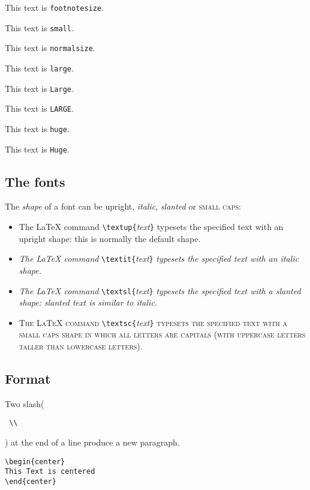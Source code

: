 {\footnotesize This text is \texttt{footnotesize}}.

{\small This text is \texttt{small}}.

{\normalsize This text is \texttt{normalsize}}.

{\large This text is \texttt{large}}.

{\Large This text is \texttt{Large}}.

{\LARGE This text is \texttt{LARGE}}.

{\huge This text is \texttt{huge}}.

{\Huge This text is \texttt{Huge}}.


\subsection{The fonts}

The \emph{shape} of a font can be \textup{upright},
\textit{italic}, \textsl{slanted} or \textsc{small caps}:
\begin{itemize}
\item
\textup{The LaTeX command}
   \verb/\textup{/\emph{text}\verb/}/
   \textup{typesets the specified text with an upright shape:
   this is normally the default shape.}
\item
\textit{The LaTeX command}
   \verb/\textit{/\emph{text}\verb/}/
   \textit{typesets the specified text with an italic shape.}
\item
\textsl{The LaTeX command}
   \verb/\textsl{/\emph{text}\verb/}/
   \textsl{typesets the specified text with a slanted shape:
   slanted text is similar to italic.}
\item
\textsc{The LaTeX command}
   \verb/\textsc{/\emph{text}\verb/}/
   \textsc{typesets the specified text with a small caps shape
   in which all letters are capitals (with uppercase letters taller than
   lowercase letters).}
\end{itemize}


\subsection{Format}

Two slash(\begin{verbatim} \\ \end{verbatim}) at the end of a line produce a new paragraph.

\begin{verbatim}
\begin{center}
This Text is centered
\end{center}
\end{verbatim}

